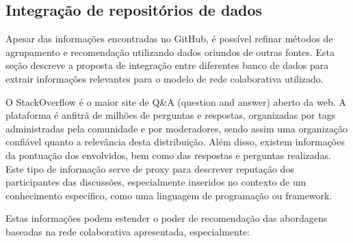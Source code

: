 \documentclass[sigconf]{acmart}
\begin{document}
\begin{table}[!h]

\centering
{}
\caption{Descrição dos Respositórios Selecionados}
\label{tab:repos}
\end{table}

\subsection{Integração de repositórios de dados}\label{sec:integracao}

Apesar das informações encontradas no GitHub, é possível refinar métodos de agrupamento e recomendação utilizando dados oriundos de outras fontes. Esta seção descreve a proposta de integração entre diferentes banco de dados para extrair informações relevantes para o modelo de rede colaborativa utilizado.

O StackOverflow é o maior site de Q&A (question and answer) aberto da web. A plataforma é anfitrã de milhões de perguntas e respostas, organizadas por tags administradas pela comunidade e por moderadores, sendo assim uma organização confiável quanto a relevância desta distribuição. Além disso, existem informações da pontuação dos envolvidos, bem como das respostas e perguntas realizadas. Este tipo de informação serve de proxy para descrever reputação dos participantes das discussões, especialmente inseridos no contexto de um conhecimento específico, como uma linguagem de programação ou framework.

Estas informações podem estender o poder de recomendação das abordagens baseadas na rede colaborativa apresentada, especialmente:
\end{document}
